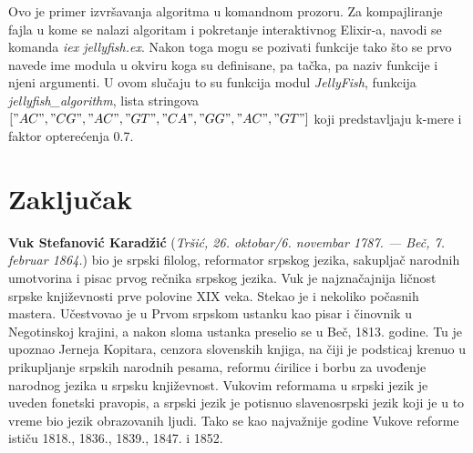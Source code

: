 \documentclass[12pt,oneside]{memoir}
\begin{document}


\newpage

Ovo je primer izvršavanja algoritma u komandnom prozoru. Za kompajliranje fajla u kome se nalazi algoritam i pokretanje interaktivnog Elixir-a, navodi se komanda \textit{iex jellyfish.ex}. Nakon toga mogu se pozivati funkcije tako što se prvo navede ime modula u okviru koga su definisane, pa tačka, pa naziv funkcije i njeni argumenti. U ovom slučaju to su funkcija modul \textit{JellyFish}, funkcija \textit{jellyfish\_algorithm}, lista stringova $["AC", "CG", "AC", "GT", "CA","GG", "AC","GT"]$ koji predstavljaju k-mere i faktor opterećenja 0.7.


\chapter{Zaključak}


\literatura

\backmatter

\begin{biografija}
  \textbf{Vuk Stefanović Karadžić} (\emph{Tršić,
    26. oktobar/6. novembar 1787. — Beč, 7. februar 1864.}) bio je
  srpski filolog, reformator srpskog jezika, sakupljač narodnih
  umotvorina i pisac prvog rečnika srpskog jezika.  Vuk je
  najznačajnija ličnost srpske književnosti prve polovine XIX
  veka. Stekao je i nekoliko počasnih mastera.  Učestvovao je u
  Prvom srpskom ustanku kao pisar i činovnik u Negotinskoj krajini, a
  nakon sloma ustanka preselio se u Beč, 1813. godine. Tu je upoznao
  Jerneja Kopitara, cenzora slovenskih knjiga, na čiji je podsticaj
  krenuo u prikupljanje srpskih narodnih pesama, reformu ćirilice i
  borbu za uvođenje narodnog jezika u srpsku književnost. Vukovim
  reformama u srpski jezik je uveden fonetski pravopis, a srpski jezik
  je potisnuo slavenosrpski jezik koji je u to vreme bio jezik
  obrazovanih ljudi. Tako se kao najvažnije godine Vukove reforme
  ističu 1818., 1836., 1839., 1847. i 1852.
\end{biografija}
\end{document}
